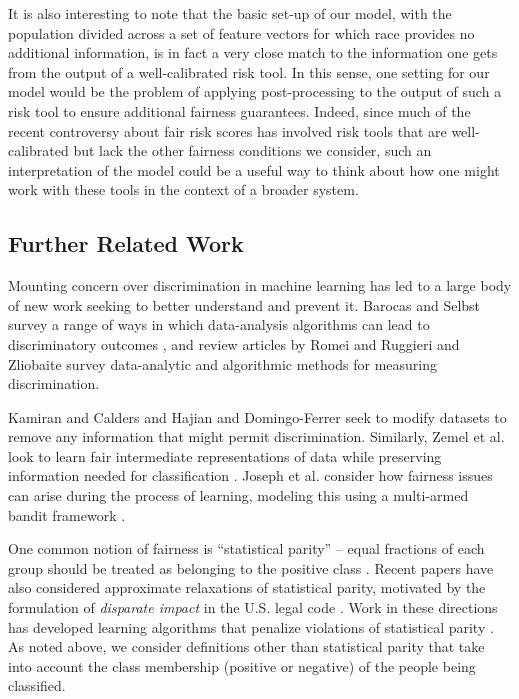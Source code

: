 \documentclass[11pt]{article}
\begin{document}
It is also interesting to note that the basic set-up of our model,
with the population divided across a set of feature vectors 
for which race provides no additional information, is in fact a very close match
to the information one gets from the output of a well-calibrated risk tool.
In this sense, one setting for our model would be the problem of
applying post-processing to the output of such a risk tool to 
ensure additional fairness guarantees.
Indeed, since much of the recent controversy about fair risk scores
has involved risk tools that are well-calibrated but lack the
other fairness conditions we consider, such an interpretation of
the model could be a useful way to think about how one might
work with these tools in the context of a broader system.




\subsection{Further Related Work}

Mounting concern over discrimination in machine learning has led to a
large body of new work seeking to better understand and prevent it.
Barocas and Selbst survey a range of ways in which data-analysis
algorithms can lead to discriminatory outcomes
\cite{big-data-disparate-impact}, and review articles by 
Romei and Ruggieri \cite{romei-discrimination-survey}
and Zliobaite \cite{zliobaite-survey} survey 
data-analytic and algorithmic methods for measuring discrimination.

Kamiran and Calders \cite{classifying-without-discrimination}
and Hajian and Domingo-Ferrer \cite{methodology-discrimination-prevention}
seek to modify datasets to remove any information that might permit
discrimination.
Similarly, Zemel et al. look to learn fair intermediate
representations of data while preserving information needed for
classification \cite{learning-fair-representations}.
Joseph et al. consider how fairness issues can arise during the process of
learning, modeling this using a multi-armed bandit framework
\cite{bandit-fairness}.

One common notion of fairness
is ``statistical parity'' -- equal fractions of each group should be
treated as belonging to the positive class
\cite{three-naive-bayes-approaches,
classifying-without-discrimination,fairness-aware-regularization}.
Recent papers have also considered approximate relaxations of 
statistical parity, motivated by the formulation of {\em disparate impact}
in the U.S. legal code 
\cite{certifying-disparate-impact,
bilal-zafar-learning-fair-classif}.
Work in these directions
has developed learning algorithms that penalize violations
of statistical parity
\cite{three-naive-bayes-approaches,fairness-aware-regularization}. 
As noted above, we consider definitions other than statistical parity
that take into account the class membership (positive or negative)
of the people being classified.
\end{document}
